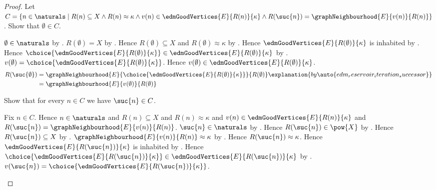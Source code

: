 \begin{proof}
    Let $C=\{n\in\naturals\mid
        R(n)\subseteq X\land
        R(n)\approx\kappa\land
        v(n)\in\edmGoodVertices{E}{R(n)}{\kappa}\land
        R(\suc{n})=\graphNeighbourhood{E}{v(n)}{R(n)}\}$.
    Show that $\emptyset\in C$.
    \begin{subproof}
        $\emptyset\in\naturals$ by .
        $R(\emptyset)=X$ by
            .
        Hence $R(\emptyset)\subseteq X$ and
            $R(\emptyset)\approx\kappa$ by
            .
        Hence $\edmGoodVertices{E}{R(\emptyset)}{\kappa}$ is inhabited by
            .
        Hence $\choice{\edmGoodVertices{E}{R(\emptyset)}{\kappa}}
            \in\edmGoodVertices{E}{R(\emptyset)}{\kappa}$ by
            .
        $v(\emptyset)=
            \choice{\edmGoodVertices{E}{R(\emptyset)}{\kappa}}$.
        Hence $v(\emptyset)\in
            \edmGoodVertices{E}{R(\emptyset)}{\kappa}$.
        \begin{align*}
            R(\suc{\emptyset})
                &= \graphNeighbourhood{E}
                    {\choice{\edmGoodVertices{E}{R(\emptyset)}{\kappa}}}
                    {R(\emptyset)}
                    \explanation{by
                        \auto{edm_reservoir_iteration_successor}}
                \\
                &= \graphNeighbourhood{E}{v(\emptyset)}{R(\emptyset)}
        \end{align*}
    \end{subproof}
    Show that for every $n\in C$ we have $\suc{n}\in C$.
    \begin{subproof}
        Fix $n\in C$.
        Hence $n\in\naturals$ and
            $R(n)\subseteq X$ and
            $R(n)\approx\kappa$ and
            $v(n)\in\edmGoodVertices{E}{R(n)}{\kappa}$ and
            $R(\suc{n})=\graphNeighbourhood{E}{v(n)}{R(n)}$.
        $\suc{n}\in\naturals$ by .
        Hence $R(\suc{n})\in\pow{X}$ by .
        Hence $R(\suc{n})\subseteq X$ by .
        $\graphNeighbourhood{E}{v(n)}{R(n)}\approx\kappa$ by
            .
        Hence $R(\suc{n})\approx\kappa$.
        Hence $\edmGoodVertices{E}{R(\suc{n})}{\kappa}$ is inhabited by
            .
        Hence $\choice{\edmGoodVertices{E}{R(\suc{n})}{\kappa}}
            \in\edmGoodVertices{E}{R(\suc{n})}{\kappa}$ by
            .
        $v(\suc{n})=
            \choice{\edmGoodVertices{E}{R(\suc{n})}{\kappa}}$.

\end{subproof}
\end{proof}
